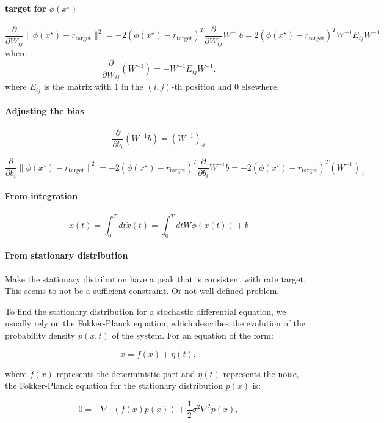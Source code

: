 \documentclass{article}
\theoremstyle{definition} \newtheorem{definition}{Definition}
\theoremstyle{remark} \newtheorem{remark}{Remark}
\begin{document}
\paragraph{target for $\phi(x^\star)$}
\[\frac{\partial}{\partial W_{ij}} \|\phi(x^\star) - r_{\operatorname{target}}\|^2 = -2(\phi(x^\star) - r_{\operatorname{target}})^T\frac{\partial}{\partial W_{ij}}W^{-1}b = 2(\phi(x^\star) - r_{\operatorname{target}})^TW^{-1} E_{ij} W^{-1} \]
where
\[
\frac{\partial}{\partial W_{ij}} \left( W^{-1} \right) = - W^{-1} E_{ij} W^{-1}.
\]
where \( E_{ij} \) is the matrix with 1 in the \( (i, j) \)-th position and 0 elsewhere.


\paragraph{Adjusting the bias}
\[
\frac{\partial}{\partial b_i} \left( W^{-1} b \right) = \left( W^{-1} \right)_{\cdot i}
\]

\[\frac{\partial}{\partial b_{i}} \|\phi(x^\star) - r_{\operatorname{target}}\|^2 = -2(\phi(x^\star) - r_{\operatorname{target}})^T\frac{\partial}{\partial b_{i}}W^{-1}b = -2(\phi(x^\star) - r_{\operatorname{target}})^T \left( W^{-1} \right)_{\cdot i}\]


\paragraph{From integration}
\[
x(t) = \int_0^Tdt \dot x(t) = \int_0^Tdt W\phi(x(t)) + b
\]

\paragraph{From stationary distribution}
Make the stationary distribution have a peak that is consistent with rate target.
This seems to not be a sufficient constraint. 
Or not well-defined problem.


To find the stationary distribution for a stochastic differential equation, we usually rely on the Fokker-Planck equation, which describes the evolution of the probability density \( p(x,t) \) of the system. For an equation of the form:

\[
\dot{x} = f(x) + \eta(t),
\]

where \( f(x) \) represents the deterministic part and \( \eta(t) \) represents the noise, the Fokker-Planck equation for the stationary distribution \( p(x) \) is:

\[
0 = -\nabla \cdot ( f(x) p(x) ) + \frac{1}{2} \sigma^2 \nabla^2 p(x),
\]
\end{document}
